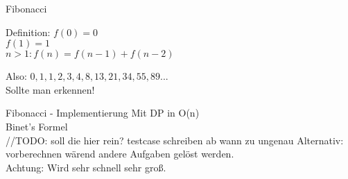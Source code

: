 \documentclass[18pt]{beamer}
\begin{document}
\begin{frame}{Fibonacci}
\begin{block}{Definition:}
	\(f(0)=0\)\\
	\(f(1)=1\)\\
 	\(n>1: f(n)=f(n-1)+f(n-2)\)\\
\end{block}
Also: \(0, 1, 1, 2, 3, 4, 8, 13, 21, 34, 55, 89...\)\\

Sollte man erkennen!
\end{frame}


\begin{frame}{Fibonacci - Implementierung}
Mit DP in O(n)\\
Binet's Formel\\ //TODO: soll die hier rein? testcase schreiben ab wann zu ungenau
Alternativ: vorberechnen wärend andere Aufgaben gelöst werden.\\
Achtung: Wird sehr schnell sehr groß.

\end{frame}
\end{document}

